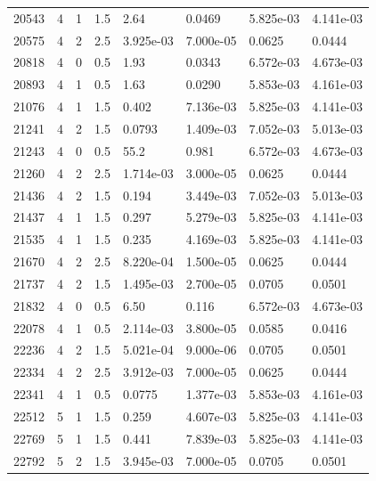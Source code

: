 \documentclass[preview]{standalone}
\begin{document}
{{{{\begin{tabular}{L{1.2cm}C{1.2cm} C{0.3cm}C{0.5cm} C{1.4cm}C{1.4cm} C{1.4cm}C{1.4cm}}
  20543  &     4  & 1     & 1.5 &  2.64  & 0.0469  & 5.825e-03 &  4.141e-03   \\ 
  20575  &     4  & 2     & 2.5 &  3.925e-03  & 7.000e-05  & 0.0625 &  0.0444   \\ 
  20818  &     4  & 0     & 0.5 &  1.93  & 0.0343  & 6.572e-03 &  4.673e-03   \\ 
  20893  &     4  & 1     & 0.5 &  1.63  & 0.0290  & 5.853e-03 &  4.161e-03   \\ 
  21076  &     4  & 1     & 1.5 &  0.402  & 7.136e-03  & 5.825e-03 &  4.141e-03   \\ 
  21241  &     4  & 2     & 1.5 &  0.0793  & 1.409e-03  & 7.052e-03 &  5.013e-03   \\ 
  21243  &     4  & 0     & 0.5 &  55.2  & 0.981  & 6.572e-03 &  4.673e-03   \\ 
  21260  &     4  & 2     & 2.5 &  1.714e-03  & 3.000e-05  & 0.0625 &  0.0444   \\ 
  21436  &     4  & 2     & 1.5 &  0.194  & 3.449e-03  & 7.052e-03 &  5.013e-03   \\ 
  21437  &     4  & 1     & 1.5 &  0.297  & 5.279e-03  & 5.825e-03 &  4.141e-03   \\ 
  21535  &     4  & 1     & 1.5 &  0.235  & 4.169e-03  & 5.825e-03 &  4.141e-03   \\ 
  21670  &     4  & 2     & 2.5 &  8.220e-04  & 1.500e-05  & 0.0625 &  0.0444   \\ 
  21737  &     4  & 2     & 1.5 &  1.495e-03  & 2.700e-05  & 0.0705 &  0.0501   \\ 
  21832  &     4  & 0     & 0.5 &  6.50  & 0.116  & 6.572e-03 &  4.673e-03   \\ 
  22078  &     4  & 1     & 0.5 &  2.114e-03  & 3.800e-05  & 0.0585 &  0.0416   \\ 
  22236  &     4  & 2     & 1.5 &  5.021e-04  & 9.000e-06  & 0.0705 &  0.0501   \\ 
  22334  &     4  & 2     & 2.5 &  3.912e-03  & 7.000e-05  & 0.0625 &  0.0444   \\ 
  22341  &     4  & 1     & 0.5 &  0.0775  & 1.377e-03  & 5.853e-03 &  4.161e-03   \\ 
  22512  &     5  & 1     & 1.5 &  0.259  & 4.607e-03  & 5.825e-03 &  4.141e-03   \\ 
  22769  &     5  & 1     & 1.5 &  0.441  & 7.839e-03  & 5.825e-03 &  4.141e-03   \\ 
  22792  &     5  & 2     & 1.5 &  3.945e-03  & 7.000e-05  & 0.0705 &  0.0501   \\ 

\end{tabular}}}}}
\end{document}
